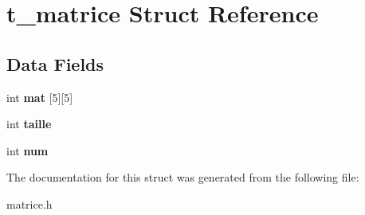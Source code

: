 \hypertarget{structt__matrice}{}\section{t\+\_\+matrice Struct Reference}
\label{structt__matrice}
\subsection*{Data Fields}
\begin{DoxyCompactItemize}
\item 
\mbox{\label{structt__matrice_a4cdb63fcd352ac15d18e513bb16ec5ad}} 
int {\bfseries mat} \mbox{[}5\mbox{]}\mbox{[}5\mbox{]}
\item 
\mbox{\label{structt__matrice_a29bf3fc0ffe4e72e45f0c84ab4f8cd1e}} 
int {\bfseries taille}
\item 
\mbox{\label{structt__matrice_a86cf672daa4e0ad11ad10efc894d19c8}} 
int {\bfseries num}
\end{DoxyCompactItemize}


The documentation for this struct was generated from the following file\+:\begin{DoxyCompactItemize}
\item 
matrice.\+h\end{DoxyCompactItemize}
